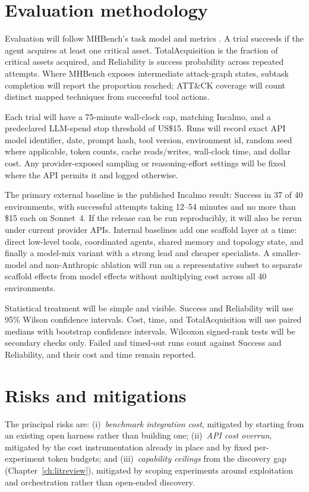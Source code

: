 \documentclass[12pt,oneside]{report}
\begin{document}
\section{Evaluation methodology}
Evaluation will follow MHBench's task model and metrics
\citep{singer2025incalmo}. A trial succeeds if the agent acquires at least one
critical asset. TotalAcquisition is the fraction of critical assets acquired, and
Reliability is success probability across repeated attempts. Where MHBench
exposes intermediate attack-graph states, subtask completion will report the
proportion reached; ATT\&CK coverage will count distinct mapped techniques from
successful tool actions.

Each trial will have a 75-minute wall-clock cap, matching Incalmo, and a
predeclared LLM-spend stop threshold of US\$15. Runs will record exact API model
identifier, date, prompt hash, tool version, environment id, random seed where
applicable, token counts, cache reads/writes, wall-clock time, and dollar cost.
Any provider-exposed sampling or reasoning-effort settings will be fixed where
the API permits it and logged otherwise.

The primary external baseline is the published Incalmo result: Success in 37 of
40 environments, with successful attempts taking 12--54 minutes and no more than
\$15 each on Sonnet~4. If the release can be run reproducibly, it will also be
rerun under current provider APIs. Internal baselines add one scaffold layer at a
time: direct low-level tools, coordinated agents, shared memory and topology
state, and finally a model-mix variant with a strong lead and cheaper
specialists. A smaller-model and non-Anthropic ablation will run on a
representative subset to separate scaffold effects from model effects without
multiplying cost across all 40 environments.

Statistical treatment will be simple and visible. Success and Reliability will
use 95\% Wilson confidence intervals. Cost, time, and TotalAcquisition will use
paired medians with bootstrap confidence intervals. Wilcoxon signed-rank tests
will be secondary checks only. Failed and timed-out runs count against Success
and Reliability, and their cost and time remain reported.

\section{Risks and mitigations}
The principal risks are: (i)~\emph{benchmark integration cost}, mitigated by
starting from an existing open harness rather than building one; (ii)~\emph{API
    cost overrun}, mitigated by the cost instrumentation already in place and by
fixed per-experiment token budgets; and (iii)~\emph{capability ceilings} from
the discovery gap (Chapter~\ref{ch:litreview}), mitigated by scoping experiments
around exploitation and orchestration rather than open-ended discovery.
\end{document}
